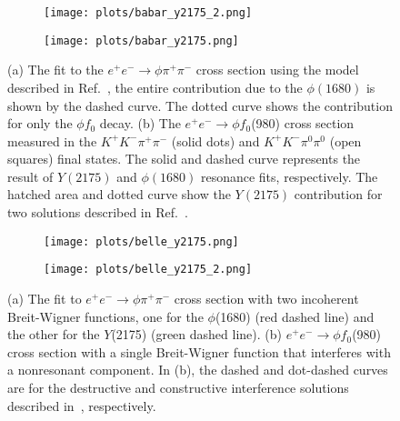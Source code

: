     \begin{figure}[H]
        \centering
        \begin{subfigure}[b]{0.45\textwidth}
            \texttt{[image: plots/babar\_y2175\_2.png]}
            \caption{}
            \label{fig.1.4.1.a}
        \end{subfigure}\hfill
        \begin{subfigure}[b]{0.45\textwidth}
            \texttt{[image: plots/babar\_y2175.png]}
            \caption{}
            \label{fig.1.4.1.b}
         \end{subfigure}
         \caption{(a) The fit to the $e^{+}e^{-}\rightarrow \phi \pi^{+} \pi^{-}$ cross section using the model described in Ref.~\cite{Aubert12}, the entire contribution due to the $\phi(1680)$ is shown by the dashed curve. The dotted curve shows the contribution for only the $\phi f_0$ decay. (b) The $e^+e^- \rightarrow \phi f_0$(980) cross section measured in the $K^{+}K^{-}\pi^{+}\pi^{-}$ (solid dots) and $K^{+}K^{-}\pi^{0}\pi^{0}$ (open squares) final states. The solid and dashed curve represents the result of $Y(2175)$ and $\phi(1680)$ resonance fits, respectively. The hatched area and dotted curve show the $Y(2175)$ contribution for two solutions described in Ref.~\cite{Aubert12}. }
        \label{fig.1.4.1}
    \end{figure}
    
    \begin{figure}[H]
        \centering
        \begin{subfigure}[b]{0.47\textwidth}
            \texttt{[image: plots/belle\_y2175.png]}
            \caption{}
            \label{fig.1.4.2.a}
        \end{subfigure}\hfill
        \begin{subfigure}[b]{0.44\textwidth}
            \texttt{[image: plots/belle\_y2175\_2.png]}
            \caption{}
            \label{fig.1.4.2.b}
         \end{subfigure}
         \caption{(a) The fit to $e^+e^- \rightarrow \phi \pi^+\pi^-$ cross section with two incoherent Breit-Wigner functions, one for the $\phi$(1680) (red dashed line) and the other for the $Y$(2175) (green dashed line). (b) $e^+e^- \rightarrow \phi f_0$(980) cross section with a single Breit-Wigner function that interferes with a nonresonant component. In (b), the dashed and dot-dashed curves are for the destructive and constructive interference solutions described in~\cite{Shen09}, respectively.}
         \label{fig.1.4.2}
    \end{figure}
    
